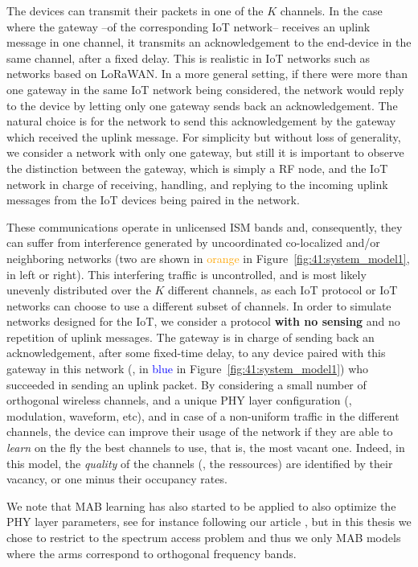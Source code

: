 The devices can transmit their packets in one of the $K$ channels. In the case where the gateway --of the corresponding IoT network-- receives an uplink message in one channel, it transmits an acknowledgement to the end-device in the same channel, after a fixed delay.
This is realistic in IoT networks such as networks based on LoRaWAN.
In a more general setting, if there were more than one gateway in the same IoT network being considered, the network would reply to the device by letting only one gateway sends back an acknowledgement.
The natural choice is for the network to send this acknowledgement by the gateway which received the uplink message.
For simplicity but without loss of generality, we consider a network with only one gateway,
but still it is important to observe the distinction between the gateway, which is simply a RF node, and the IoT network in charge of receiving, handling, and replying to the incoming uplink messages from the IoT devices being paired in the network.
%

These communications operate in unlicensed ISM bands and, consequently, they can suffer from interference generated by uncoordinated co-localized and/or neighboring networks (two are shown in \textcolor{orange}{orange} in Figure~\ref{fig:41:system_model1}, in left or right).
This interfering traffic is uncontrolled, and is most likely unevenly distributed over the $K$ different channels,
as each IoT protocol or IoT networks can choose to use a different subset of channels.
%
In order to simulate networks designed for the IoT, we consider a protocol \textbf{with no sensing} and no repetition of uplink messages. The gateway is in charge of sending back an acknowledgement, after some fixed-time delay, to any device paired with this gateway in this network (\ie, in \textcolor{blue}{blue} in Figure~\ref{fig:41:system_model1}) who succeeded in sending an uplink packet.
%
By considering a small number of orthogonal wireless channels, and a unique PHY layer configuration (\ie, modulation, waveform, etc), and in case of a non-uniform traffic in the different channels,
the device can improve their usage of the network if they are able to \emph{learn} on the fly the best channels to use, that is, the most vacant one. Indeed, in this model, the \emph{quality} of the channels (\ie, the ressources) are identified by their vacancy, or one minus their occupancy rates.

We note that MAB learning has also started to be applied to also optimize the PHY layer parameters, see for instance \cite{KerkoucheAlami18} following our article \cite{Bonnefoi17},
but in this thesis we chose to restrict to the spectrum access problem and thus we only MAB models where the arms correspond to orthogonal frequency bands.


